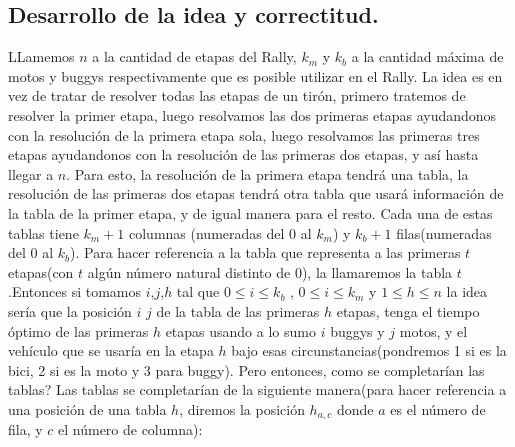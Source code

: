 \vspace*{0.6cm}
\subsection{Desarrollo de la idea y correctitud.}

\vspace*{0.3cm}

LLamemos $n$ a la cantidad de etapas del Rally, $k_{m}$ y $k_{b}$ a la cantidad máxima de motos y buggys respectivamente que es posible utilizar en el Rally. La idea es en vez de tratar de resolver todas las etapas de un tirón, primero tratemos de resolver la primer etapa, luego resolvamos las dos primeras etapas ayudandonos con la resolución de la primera etapa sola, luego resolvamos las primeras tres etapas ayudandonos con la resolución de las primeras dos etapas, y así hasta llegar a $n$. Para esto, la resolución de la primera etapa tendrá una tabla, la resolución de las primeras dos etapas tendrá otra tabla que usará información de la tabla de la primer etapa, y de igual manera para el resto. Cada una de estas tablas tiene $k_{m}+1$ columnas (numeradas del $0$ al $k_{m}$) y $k_{b}+1$ filas(numeradas del $0$ al $k_{b}$). Para hacer referencia a la tabla que representa a las primeras $t$ etapas(con $t$ algún número natural distinto de 0), la llamaremos la tabla $t$.Entonces si tomamos $i$,$j$,$h$ tal que $0\leq i \leq k_{b}$ , $0\leq i \leq k_{m}$ y $1\leq h \leq n$ la idea sería que la posición $i$ $j$ de la tabla de las primeras $h$ etapas, tenga el tiempo óptimo de las primeras $h$ etapas usando a lo sumo $i$ buggys y $j$ motos, y el vehículo que se usaría en la etapa $h$ bajo esas circunstancias(pondremos 1 si es la bici, 2 si es la moto y 3 para buggy). Pero entonces, como se completarían las tablas? Las tablas se completarían de la siguiente manera(para hacer referencia a una posición de una tabla $h$, diremos la posición $h_{a,c}$ donde $a$ es el número de fila, y $c$ el número de columna):

